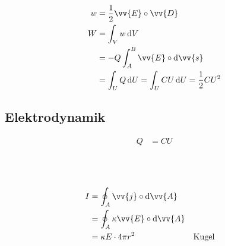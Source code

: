\begin{boxleft}
\\
\\
\end{boxleft}\begin{boxrightshaded}
\begin{align*}
w&=\frac{1}{2}\vv{E}\circ\vv{D}\\
W &=\int_Vw\diff V\\
  &=-Q\int_A^B\vv{E}\circ\diff\vv{s}\\
  &=\int_U Q\diff U= \int_U CU \diff U=\frac{1}{2}CU^2
\end{align*}
\end{boxrightshaded}

\subsection{Elektrodynamik}

\begin{boxleft}
\end{boxleft}\begin{boxrightshaded}
\begin{align*}
Q&=CU
\end{align*}
\end{boxrightshaded}

\begin{boxleft}
\\
\\
\end{boxleft}\begin{boxrightshaded}
\begin{align*}
I &=\oint_A\vv{j}\circ\diff\vv{A}\\
  &=\oint_A \kappa\vv{E}\circ\diff\vv{A}\\
  &=\kappa E\cdot 4\pi r^2&&\text{Kugel}
\end{align*}
\end{boxrightshaded}


